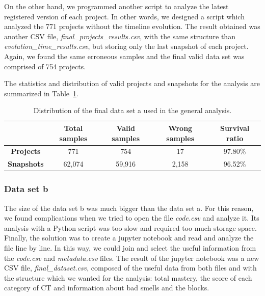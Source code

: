 On the other hand, we programmed another script to analyze the latest registered version of each project. In other words, we designed a script which analyzed the 771 projects without the timeline evolution. The result obtained was another CSV file, \textit{final\_projects\_results.csv}, with the same structure than \textit{evolution\_time\_results.csv}, but storing only the last snapshot of each project. Again, we found the same erroneous samples and the final valid data set was comprised of 754 projects.

The statistics and distribution of valid projects and snapshots for the analysis are summarized in Table~\ref{table:datacollection_a}.

\begin{table}
 \begin{center}
  \begin{tabular}{|c|c|c|c|c|}
    \hline
     & \textbf{Total samples} & \textbf{Valid samples} & \textbf{Wrong samples} & \textbf{Survival ratio} \\ \hline
    \textbf{Projects} & 771 & 754 & 17 & 97.80\% \\ \hline
    \textbf{Snapshots}& 62,074 & 59,916 & 2,158 & 96.52\% \\ \hline
  \end{tabular}
  \caption{Distribution of the final data set a used in the general analysis.}
  \label{table:datacollection_a}
 \end{center}
\end{table}


\subsubsection{Data set b}
\label{subsubsec:datacollection_b}

The size of the data set b was much bigger than the data set a. For this reason, we found complications when we tried to open the file \textit{code.csv} and analyze it. Its analysis with a Python script was too slow and required too much storage space. Finally, the solution was to create a jupyter notebook and read and analyze the file line by line. In this way, we could join and select the useful information from the \textit{code.csv} and \textit{metadata.csv} files. The result of the jupyter notebook was a new CSV file, \textit{final\_dataset.csv}, composed of the useful data from both files and with the structure which we wanted for the analysis: total mastery, the score of each category of CT and information about bad smells and the blocks. 

